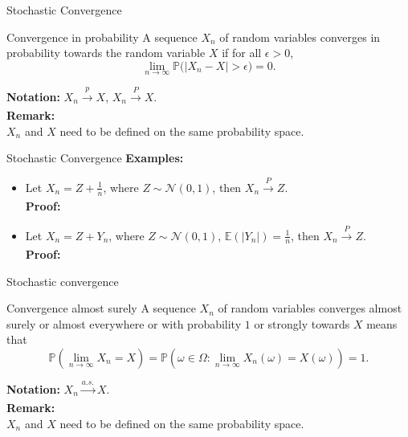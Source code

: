 \documentclass [aspectratio=169]{beamer}
\begin{document}
\begin{frame}{Stochastic Convergence}
    \begin{block}{Convergence in probability}
    A sequence $X_n$ of random variables converges in probability towards the random variable $X$ if for all $\epsilon > 0$, 
    $$
    \lim _{n\to \infty }\mathbb{P} {\big (}|X_{n}-X|>\epsilon {\big )}=0.
    $$
    \end{block}
    \vspace{0.1in}
    \textbf{Notation:}
    $X_n \xrightarrow[]{p} X$, \quad $X_n \xrightarrow[]{P} X$.\\
\vspace{0.1in}
\textbf{Remark:}\\
$X_n$ and $X$ need to be defined on the same probability space. 
\end{frame}


\begin{frame}{Stochastic Convergence}
    \textbf{Examples:}\\
    \begin{itemize}
        \item Let $X_n = Z + \frac{1}{n}$, where $Z \sim \mathcal{N}(0,1)$, then $X_n \xrightarrow[]{P} Z$.\\
    \vspace{0.1in}
    \textbf{Proof:}\\
    \vspace{0.7in}
    \item Let $X_n = Z + Y_n$, where $Z \sim \mathcal{N}(0,1)$, $\mathbb{E}(|Y_n|) = \frac{1}{n}$, then $X_n \xrightarrow[]{P} Z$.\\
    \vspace{0.1in}
    \textbf{Proof:}\\
    \vspace{1in}
    \end{itemize}
\end{frame}


\begin{frame}{Stochastic convergence}
    \begin{block}{Convergence almost surely}
    A sequence $X_n$ of random variables converges almost surely or almost everywhere or with probability $1$ or strongly towards $X$ means that
$$
\mathbb{P}\left(\lim _{n\to \infty }\!X_{n}=X\right)= \mathbb{P}\left(\omega \in \Omega: \lim _{n\to \infty }\!X_{n}(\omega)=X(\omega)\right) =1.
$$
\end{block}
\vspace{0.1in}
    \textbf{Notation:}
    $X_n \xrightarrow[]{a.s.} X$.\\
\vspace{0.1in}
\textbf{Remark:}\\
$X_n$ and $X$ need to be defined on the same probability space. 
\end{frame}
\end{document}
